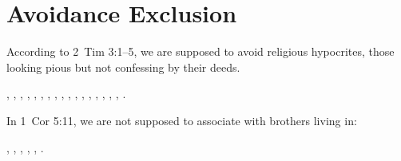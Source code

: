 \section{Avoidance Exclusion}

According to 2~Tim 3:1--5, we are supposed to avoid religious hypocrites, those looking pious but not confessing by their deeds.

, 
, 
, 
, 
, 
, 
, 
, 
, 
, 
, 
, 
, 
,
, 
, 
, 
.

In 1~Cor 5:11, we are not supposed to associate with brothers living in: 

, 
, 
, 
, 
, 
.
